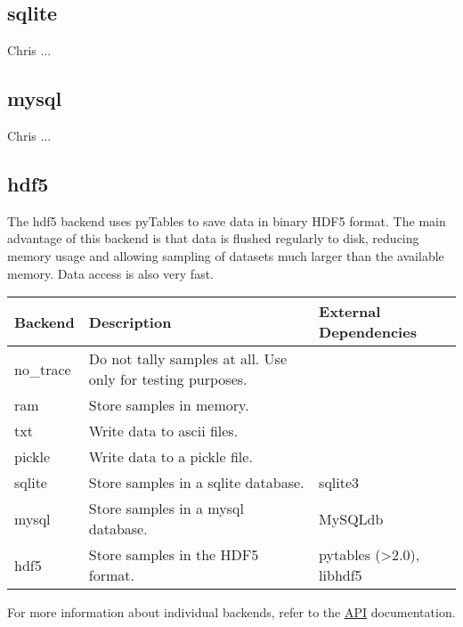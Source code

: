 \subsection*{sqlite}
\label{sqlite}

Chris ...



\hypertarget{mysql}{}
\subsection*{mysql}
\label{mysql}

Chris ...



\hypertarget{hdf5}{}
\subsection*{hdf5}
\label{hdf5}

The hdf5 backend uses pyTables to save data in binary HDF5 format. The main advantage of this backend is that data is flushed regularly to disk, reducing memory usage and allowing sampling of datasets much larger than the available memory. Data access is also very fast.

\leavevmode
\begin{longtable}[c]{|p{0.109\locallinewidth}|p{0.584\locallinewidth}|p{0.252\locallinewidth}|}
\hline
\textbf{
Backend
} & \textbf{
Description
} & \textbf{
External Dependencies
} \\
\hline
\endhead

no{\_}trace
 & 
Do not tally samples at all. Use only for testing purposes.
 &  \\
\hline

ram
 & 
Store samples in memory.
 &  \\
\hline

txt
 & 
Write data to ascii files.
 &  \\
\hline

pickle
 & 
Write data to a pickle file.
 &  \\
\hline

sqlite
 & 
Store samples in a sqlite database.
 & 
sqlite3
 \\
\hline

mysql
 & 
Store samples in a mysql database.
 & 
MySQLdb
 \\
\hline

hdf5
 & 
Store samples in the HDF5 format.
 & 
pytables ({\textgreater}2.0), libhdf5
 \\
\hline
\end{longtable}

For more information about individual backends, refer to the \href{docs/API.pdf}{API} documentation.

\